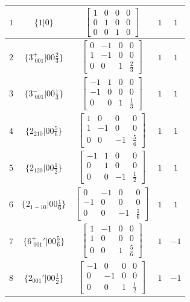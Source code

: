 \documentclass[fleqn,8pt]{jsarticle}
\begin{document}
\begin{longtable}{ccccc}
$ 1 $ & $ \{1|0\} $ & $ \begin{bmatrix} 1 & 0 & 0 & 0 \\ 0 & 1 & 0 & 0 \\ 0 & 0 & 1 & 0 \end{bmatrix} $ & $ 1 $ & $ 1 $ \\ \hline
$ 2 $ & $ \{3^{+}_{\,\,001}|0 0 \frac{2}{3}\} $ & $ \begin{bmatrix} 0 & -1 & 0 & 0 \\ 1 & -1 & 0 & 0 \\ 0 & 0 & 1 & \frac{2}{3} \end{bmatrix} $ & $ 1 $ & $ 1 $ \\ \hline
$ 3 $ & $ \{3^{-}_{\,\,001}|0 0 \frac{1}{3}\} $ & $ \begin{bmatrix} -1 & 1 & 0 & 0 \\ -1 & 0 & 0 & 0 \\ 0 & 0 & 1 & \frac{1}{3} \end{bmatrix} $ & $ 1 $ & $ 1 $ \\ \hline
$ 4 $ & $ \{2{}_{210}|0 0 \frac{5}{6}\} $ & $ \begin{bmatrix} 1 & 0 & 0 & 0 \\ 1 & -1 & 0 & 0 \\ 0 & 0 & -1 & \frac{5}{6} \end{bmatrix} $ & $ 1 $ & $ 1 $ \\ \hline
$ 5 $ & $ \{2{}_{120}|0 0 \frac{1}{2}\} $ & $ \begin{bmatrix} -1 & 1 & 0 & 0 \\ 0 & 1 & 0 & 0 \\ 0 & 0 & -1 & \frac{1}{2} \end{bmatrix} $ & $ 1 $ & $ 1 $ \\ \hline
$ 6 $ & $ \{2{}_{1-10}|0 0 \frac{1}{6}\} $ & $ \begin{bmatrix} 0 & -1 & 0 & 0 \\ -1 & 0 & 0 & 0 \\ 0 & 0 & -1 & \frac{1}{6} \end{bmatrix} $ & $ 1 $ & $ 1 $ \\ \hline
$ 7 $ & $ \{6^{+}_{\,\,001}{}'|0 0 \frac{5}{6}\} $ & $ \begin{bmatrix} 1 & -1 & 0 & 0 \\ 1 & 0 & 0 & 0 \\ 0 & 0 & 1 & \frac{5}{6} \end{bmatrix} $ & $ 1 $ & $ -1 $ \\ \hline
$ 8 $ & $ \{2{}_{001}{}'|0 0 \frac{1}{2}\} $ & $ \begin{bmatrix} -1 & 0 & 0 & 0 \\ 0 & -1 & 0 & 0 \\ 0 & 0 & 1 & \frac{1}{2} \end{bmatrix} $ & $ 1 $ & $ -1 $ \\ \hline

\end{longtable}
\end{document}
